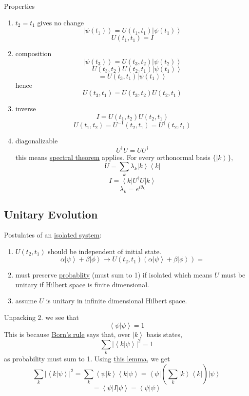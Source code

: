 \documentclass[
]{article}
\providecommand{\tightlist}{%
  \setlength{\itemsep}{0pt}\setlength{\parskip}{0pt}}
\let\oldhyperref\hyperref
\renewcommand{\hyperref}[2][]{\oldhyperref[#1]{\underline{#2}}}
\providecommand{\ket}[1]{\left\lvert #1 \right\rangle}
\providecommand{\bra}[1]{\left\langle #1 \right\rvert}
\providecommand{\braket}[1]{\left\langle #1 \right\rangle}
\providecommand{\rarr}{\rightarrow}
\begin{document}
Properties
\begin{enumerate}
	\tightlist
	\item $t_2=t_1$ gives no change
	      \[
		      \ket{\psi(t_1)}=U(t_1, t_1)\ket{\psi(t_1)}
	      \]
	      \[
		      U(t_1, t_1)=I
	      \]
	\item composition
	      \[
		      \ket{\psi(t_3)}=U(t_3, t_2)\ket{\psi(t_2)}
	      \]
	      \[
		      =U(t_3, t_2)U(t_2, t_1)\ket{\psi(t_1)}
	      \]
	      \[
		      =U(t_3, t_1)\ket{\psi(t_1)}
	      \]
	      hence
	      \[
		      U(t_3, t_1)=U(t_3, t_2)U(t_2, t_1)
	      \]
	\item inverse
	      \[
		      I=U(t_1,t_2)U(t_2,t_1)
	      \]
	      \[
		      U(t_1,t_2)=U^{-1}(t_2,t_1)=U^\dag(t_2, t_1)
	      \]
	\item diagonalizable
	      \[
		      U^\dag U = U U^\dag
	      \]
	      this means \hyperref[spectral-decomposition]{spectral theorem} applies.
	      For every orthonormal basis $\{\ket{k}\}$,
	      \[
		      U=\sum_k\lambda_k\ket{k}\bra{k}
	      \]
	      \[
		      I=\bra{k}U^\dag U\ket{k}
	      \]
	      \[
		      \lambda_k=e^{i\theta_k}
	      \]
\end{enumerate}


\subsection{Unitary Evolution}\label{unitary-evolution}

Postulates of an \hyperref[isolated-system]{isolated system}:

\begin{enumerate}
	\tightlist
	\item $U(t_2,t_1)$ should be independent of initial state.
	      \[
		      \alpha\ket{\psi}+\beta\ket{\phi}\rarr U(t_2,t_1)(\alpha\ket{\psi}+\beta\ket{\phi})=
	      \]
	\item must preserve \hyperref[probability-theory]{probablity} (must sum to 1) if isolated which means $U$ must be \hyperref[unitary-operator]{unitary} if \hyperref[hilbert-spaces]{Hilbert space} is finite dimensional.
	\item assume $U$ is unitary in infinite dimensional Hilbert space.
\end{enumerate}

Unpacking 2. we see that
\[
	\braket{\psi|\psi}=1
\]
This is because \hyperref[borns-rule]{Born's rule} says that, over $\ket{k}$ basis states,
\[
	\sum_k |\braket{k|\psi}|^2=1
\]
as probability must sum to 1.
Using \hyperref[absolute-value-of-complex-number]{this lemma}, we get
\[
	\sum_k|\braket{k|\psi}|^2=\sum_k\braket{\psi|k}\braket{k|\psi}=\bra{\psi}\left(\sum_k\ket{k}\bra{k}\right)\ket{\psi}
\]
\[
	=\bra{\psi}I\ket{\psi}=\braket{\psi|\psi}
\]
\end{document}
